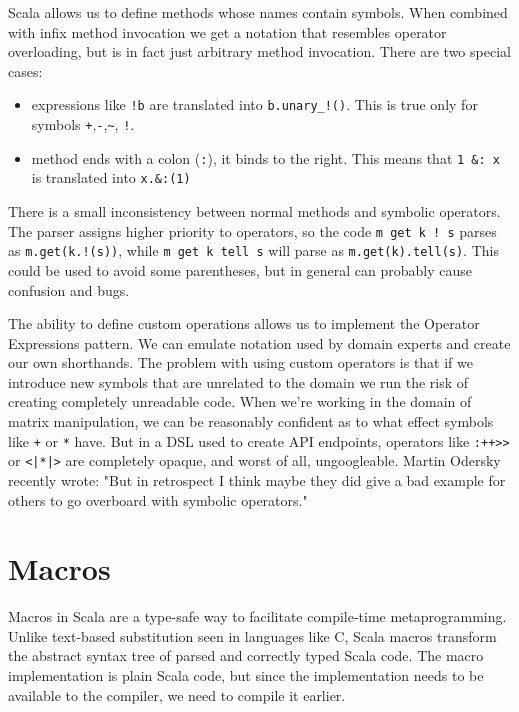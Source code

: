 Scala allows us to define methods whose names contain symbols. When combined with infix method invocation we get a notation that resembles operator overloading, but is in fact just arbitrary method invocation. There are two special cases: 
\begin{itemize}
	\item expressions like \texttt{!b} are translated into \texttt{b.unary\_!()}. This is true only for symbols \texttt{+},\texttt{-},\texttt{\~}, \texttt{!}.
	\item method ends with a colon (\texttt{:}), it binds to the right. This means that \texttt{1 \&: x} is translated into \texttt{x.\&:(1)}
\end{itemize}

There is a small inconsistency between normal methods and symbolic operators. The parser assigns higher priority to operators, so the code \texttt{m get k ! s} parses as \texttt{m.get(k.!(s))}, while \texttt{m get k tell s} will parse as \texttt{m.get(k).tell(s)}. This could be used to avoid some parentheses, but in general can probably cause confusion and bugs.

The ability to define custom operations allows us to implement the Operator Expressions pattern. We can emulate notation used by domain experts and create our own shorthands. The problem with using custom operators is that if we introduce new symbols that are unrelated to the domain we run the risk of creating completely unreadable code. When we're working in the domain of matrix manipulation, we can be reasonably confident as to what effect symbols like \texttt{+} or \texttt{*} have. But in a DSL used to create API endpoints, operators like \texttt{:++>>} or \texttt{<|*|>} are completely opaque, and worst of all, ungoogleable. Martin Odersky recently wrote: "But in retrospect I think maybe they did give a bad example for others to go overboard with symbolic operators." \autocite{Odersky:2016}


\section{Macros}

Macros in Scala are a type-safe way to facilitate compile-time metaprogramming. Unlike text-based substitution seen in languages like C, Scala macros transform the abstract syntax tree of parsed and correctly typed Scala code. The macro implementation is plain Scala code, but since the implementation needs to be available to the compiler, we need to compile it earlier.

